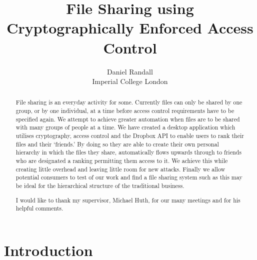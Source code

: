 \documentclass[12pt, titlepage]{article}
\title{File Sharing using Cryptographically Enforced Access Control}
\author{Daniel Randall \\ Imperial College London}
\date{}
\begin{document}
\maketitle

\begin{abstract}
File sharing is an everyday activity for some. Currently files can only be shared by one group, or by one individual, at a time before access control requirements have to be specified again. We attempt to achieve greater automation when files are to be shared with many groups of people at a time. We have created a desktop application which utilises cryptography, access control and the Dropbox API to enable users to rank their files and their `friends.' By doing so they are able to create their own personal hierarchy in which the files they share, automatically flows upwards through to friends who are designated a ranking permitting them access to it. We achieve this while creating little overhead and leaving little room for new attacks. Finally we allow potential consumers to test of our work and find a file sharing system such as this may be ideal for the hierarchical structure of the traditional business.
\end{abstract}

\renewcommand{\abstractname}{Acknowledgements}
\begin{abstract}
I would like to thank my supervisor, Michael Huth, for our many meetings and for his helpful comments.
\end{abstract}


\newpage
\tableofcontents
\newpage

\newcommand{\defeq}{\stackrel{\textup{\tiny def}}{=}}

\section{Introduction}
\end{document}

